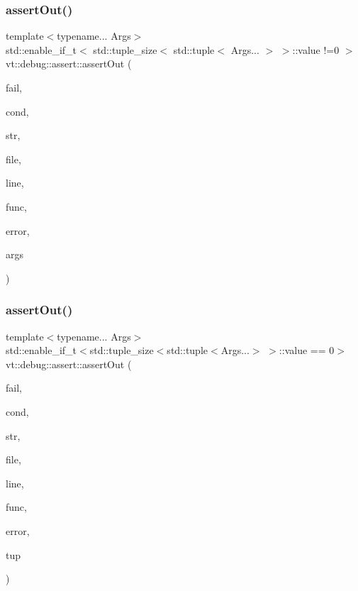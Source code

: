 \subsubsection{\texorpdfstring{assert\+Out()}{assertOut()}\hspace{0.1cm}{\footnotesize\ttfamily [2/3]}}
{\footnotesize\ttfamily template$<$typename... Args$>$ \\
std\+::enable\+\_\+if\+\_\+t$<$ std\+::tuple\+\_\+size$<$ std\+::tuple$<$ Args... $>$ $>$\+::value !=0 $>$ vt\+::debug\+::assert\+::assert\+Out (\begin{DoxyParamCaption}\item[{bool}]{fail,  }\item[{std\+::string const}]{cond,  }\item[{std\+::string const \&}]{str,  }\item[{std\+::string const \&}]{file,  }\item[{int const}]{line,  }\item[{std\+::string const \&}]{func,  }\item[{\hyperlink{namespacevt_a793764d753923abc3d32929870beb485}{Error\+Code\+Type}}]{error,  }\item[{std\+::tuple$<$ Args... $>$ \&\&}]{args }\end{DoxyParamCaption})\hspace{0.3cm}{\ttfamily [inline]}}

\mbox{\label{namespacevt_1_1debug_1_1assert_af31fa4a20c73d621b9611a1bae95b5cd}} 
\subsubsection{\texorpdfstring{assert\+Out()}{assertOut()}\hspace{0.1cm}{\footnotesize\ttfamily [3/3]}}
{\footnotesize\ttfamily template$<$typename... Args$>$ \\
std\+::enable\+\_\+if\+\_\+t$<$std\+::tuple\+\_\+size$<$std\+::tuple$<$Args...$>$ $>$\+::value == 0$>$ vt\+::debug\+::assert\+::assert\+Out (\begin{DoxyParamCaption}\item[{bool}]{fail,  }\item[{std\+::string const}]{cond,  }\item[{std\+::string const \&}]{str,  }\item[{std\+::string const \&}]{file,  }\item[{int const}]{line,  }\item[{std\+::string const \&}]{func,  }\item[{\hyperlink{namespacevt_a793764d753923abc3d32929870beb485}{Error\+Code\+Type}}]{error,  }\item[{\mbox{[}\mbox{[}maybe\+\_\+unused\mbox{]} \mbox{]} std\+::tuple$<$ Args... $>$ \&\&}]{tup }\end{DoxyParamCaption})\hspace{0.3cm}{\ttfamily [inline]}}

